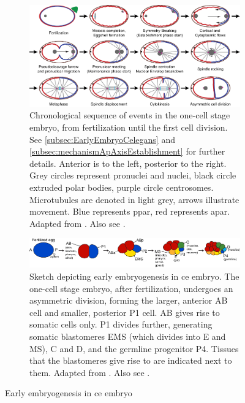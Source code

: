 \begin{figure}

\centering
\begin{subfigure}{\textwidth}
    \centering
    \includegraphics[width=\textwidth]{Introduction/FigureEarlyEmbryogenesis/firstCellEvents.pdf}
    \caption{Chronological sequence of events in the one-cell stage embryo, from fertilization until the first cell division. See \autoref{subsec:EarlyEmbryoCelegans} and \autoref{subsec:mechanismApAxisEstablishment} for further details. Anterior is to the left, posterior to the right. Grey circles represent pronuclei and nuclei, black circle extruded polar bodies, purple circle centrosomes. Microtubules are denoted in light grey, arrows illustrate movement. Blue represents \acs{ppar}, red represents \acs{apar}. Adapted from \cite{mirjam2010mechanics}. Also see \cite{schneider2003cell}.}
    \label{subfig:embryogenesisCelegans-onecell}
\end{subfigure}
\hfill
\begin{subfigure}{\textwidth}
    \centering
    \includegraphics[width=\textwidth]{Introduction/FigureEarlyEmbryogenesis/fullEmbryogenesis.pdf}
    \caption{Sketch depicting early embryogenesis in \acs{ce} embryo. The one-cell stage embryo, after fertilization, undergoes an asymmetric division, forming the larger, anterior AB cell and smaller, posterior P1 cell. AB gives rise to somatic cells only. P1 divides further, generating somatic blastomeres EMS (which divides into E and MS), C and D, and the germline progenitor P4. Tissues that the blastomeres give rise to are indicated next to them. Adapted from \cite{mirjam2010mechanics}. Also see \cite{strome1989generation}.}
    \label{subfig:embryogenesisCelegans-full}
\end{subfigure}

\caption[Early embryogenesis in \acs{ce}]{Early embryogenesis in \acs{ce} embryo}
\label{fig:embryogenesisCelegans}

\end{figure}

